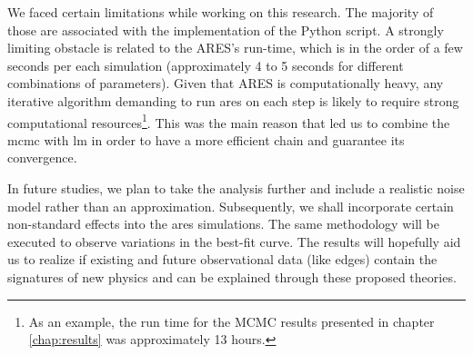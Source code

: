 \documentclass[12pt, TexShade, letterpaper]{report}
\begin{document}
We faced certain limitations while working on this research. The majority of those are associated with the implementation of the Python script. 
A strongly limiting obstacle is related to the ARES's run-time, which is in the order of a few seconds per each simulation (approximately 4 to 5 seconds for different combinations of parameters). Given that ARES is computationally heavy, any iterative algorithm demanding to run \gls{ares} on each step is likely to require strong computational resources\footnote{ As an example, the run time for the MCMC results presented in chapter \ref{chap:results} was approximately 13 hours.}. This was the main reason that led us to combine the \gls{mcmc} with \gls{lm} in order to have a more efficient chain and guarantee its convergence.\par 

In future studies, we plan to take the analysis further and include a realistic noise model rather than an approximation. Subsequently, we shall incorporate certain non-standard effects into the \gls{ares} simulations. The same methodology will be executed to observe variations in the best-fit curve. 
The results will hopefully aid us to realize if existing and future observational data (like \gls{edges}) contain the signatures of new physics and can be explained through these proposed theories.\par


\label{chap:appendix,sub:code}
	{
	
	
	
	
	}
\end{document}
